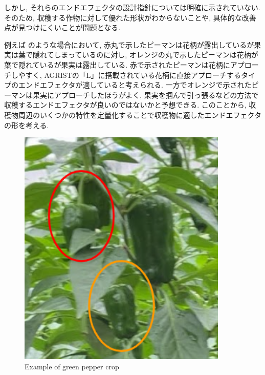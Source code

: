 しかし, それらのエンドエフェクタの設計指針については明確に示されていない.
そのため, 収穫する作物に対して優れた形状がわからないことや, 具体的な改善点が見つけにくいことが問題となる.

\vspace{5mm}

例えば のような場合において, 赤丸で示したピーマンは花柄が露出しているが果実は葉で隠れてしまっているのに対し, オレンジの丸で示したピーマンは花柄が葉で隠れているが果実は露出している.
赤で示されたピーマンは花柄にアプローチしやすく, AGRISTの「L」に搭載されている花柄に直接アプローチするタイプのエンドエフェクタが適していると考えられる.
一方でオレンジで示されたピーマンは果実にアプローチしたほうがよく, 果実を掴んで引っ張るなどの方法で収穫するエンドエフェクタが良いのではないかと予想できる.
このことから, 収穫物周辺のいくつかの特性を定量化することで収穫物に適したエンドエフェクタの形を考える.

\vspace{5mm}
\begin{figure}[H]
     \centering
     \includegraphics[width=100mm]{images/png/plantex.png}
     \caption{Example of green pepper crop}
     \label{Fig:plantex}
\end{figure}

\newpage
